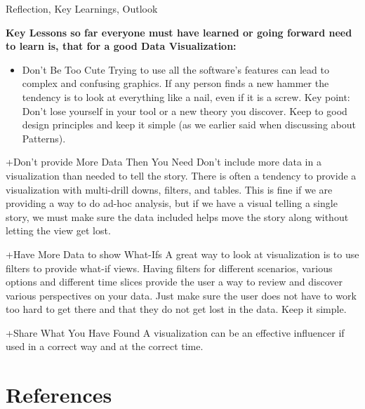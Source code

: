 \documentclass[]{book}
\providecommand{\tightlist}{%
  \setlength{\itemsep}{0pt}\setlength{\parskip}{0pt}}
\theoremstyle{definition}
\theoremstyle{definition}
\theoremstyle{definition}
\theoremstyle{remark}
\begin{document}
Reflection, Key Learnings, Outlook

\textbf{Key Lessons so far everyone must have learned or going forward
need to learn is, that for a good Data Visualization:}

\begin{itemize}
\tightlist
\item
  Don't Be Too Cute Trying to use all the software's features can lead
  to complex and confusing graphics. If any person finds a new hammer
  the tendency is to look at everything like a nail, even if it is a
  screw. Key point: Don't lose yourself in your tool or a new theory you
  discover. Keep to good design principles and keep it simple (as we
  earlier said when discussing about Patterns).
\end{itemize}

+Don't provide More Data Then You Need Don't include more data in a
visualization than needed to tell the story. There is often a tendency
to provide a visualization with multi-drill downs, filters, and tables.
This is fine if we are providing a way to do ad-hoc analysis, but if we
have a visual telling a single story, we must make sure the data
included helps move the story along without letting the view get lost.

+Have More Data to show What-Ifs A great way to look at visualization is
to use filters to provide what-if views. Having filters for different
scenarios, various options and different time slices provide the user a
way to review and discover various perspectives on your data. Just make
sure the user does not have to work too hard to get there and that they
do not get lost in the data. Keep it simple.

+Share What You Have Found A visualization can be an effective
influencer if used in a correct way and at the correct time.

\chapter*{References}\label{references-1}
\end{document}
